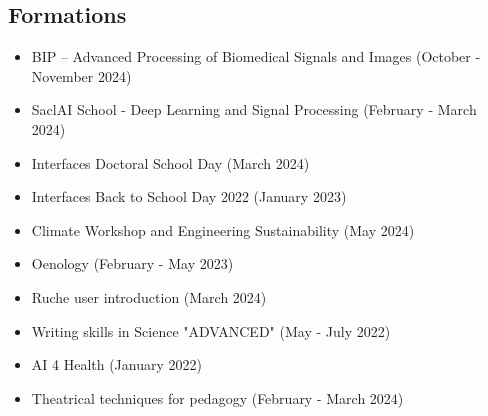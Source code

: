 \subsection*{Formations}
\begin{itemize}
	\item BIP – Advanced Processing of Biomedical Signals and Images (October - November 2024)
	\item SaclAI School - Deep Learning and Signal Processing (February - March 2024)
	\item Interfaces Doctoral School Day (March 2024)
	\item Interfaces Back to School Day 2022 (January 2023)
	\item Climate Workshop and Engineering Sustainability (May 2024)
	\item Oenology (February - May 2023)
	\item Ruche user introduction (March 2024)
	\item Writing skills in Science "ADVANCED" (May - July 2022)
	\item AI 4 Health (January 2022)
	\item Theatrical techniques for pedagogy (February - March 2024)
\end{itemize}